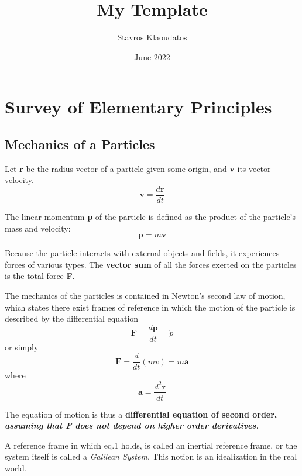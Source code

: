 \documentclass{article}
\title{My Template}
\author{Stavros Klaoudatos}
\date{June 2022}
\begin{document}
\maketitle

\section{Survey of Elementary Principles}

\subsection{Mechanics of a Particles}

Let \textbf{r} be the radius vector of a particle given some origin, and \textbf{v} its vector velocity.
\\
\begin{equation*}
    \textbf{v} = \frac{d\textbf{r}}{dt}
\end{equation*}


The linear momentum \textbf{p} of the particle is defined as the product of the particle's mass and velocity:
\\
\begin{equation*}
    \textbf{p} = m\textbf{v}
\end{equation*}


Because the particle interacts with external objects and fields, it experiences forces of various types. The \textbf{vector sum} of all the forces exerted on the particles is the total force \textbf{F}.

The mechanics of the particles is contained in Newton's second law of motion, which states there exist frames of reference in which the motion of the particle is described by the differential equation 
\begin{equation*}
    \textbf{F} = \frac{d \textbf{p}}{dt} = \dot{p}
\end{equation*}
or simply
\\
\begin{equation}
    \textbf{F} = \frac{d}{dt}(mv) = m\textbf{a}
\end{equation}
where 
\begin{equation*}
    \textbf{a} = \frac{d^2 \textbf{r}}{dt}
\end{equation*}

The equation of motion is thus a \textbf{differential equation of second order, \textit{assuming that F does not depend on higher order derivatives.}}

A reference frame in which eq.1 holds, is called an inertial reference frame, or the system itself is called a \textit{Galilean System}. This notion is an idealization in the real world.
\end{document}
